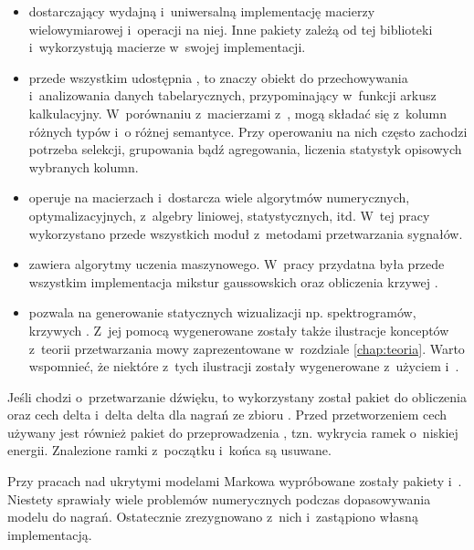 \begin{itemize}
    \item {} dostarczający wydajną i~uniwersalną implementację macierzy wielowymiarowej i~operacji na niej.
        Inne pakiety zależą od tej biblioteki i~wykorzystują macierze w~swojej implementacji.
    \item {} przede wszystkim udostępnia , to znaczy obiekt do przechowywania i~analizowania danych tabelarycznych, przypominający w~funkcji arkusz kalkulacyjny. W~porównaniu z~macierzami z~,  mogą składać się z~kolumn różnych typów i~o różnej semantyce. Przy operowaniu na nich często zachodzi potrzeba selekcji, grupowania bądź agregowania, liczenia statystyk opisowych wybranych kolumn.
    \item {} operuje na macierzach  i~dostarcza wiele algorytmów numerycznych, optymalizacyjnych, z~algebry liniowej, statystycznych, itd. W~tej pracy wykorzystano przede wszystkich moduł z~metodami przetwarzania sygnałów.
    \item {} zawiera algorytmy uczenia maszynowego. W~pracy przydatna była przede wszystkim implementacja mikstur gaussowskich oraz obliczenia krzywej .
    \item {} pozwala na generowanie statycznych wizualizacji np. spektrogramów, krzywych . Z~jej pomocą wygenerowane zostały także ilustracje konceptów z~teorii przetwarzania mowy zaprezentowane w~rozdziale \ref{chap:teoria}. Warto wspomnieć, że niektóre z~tych ilustracji zostały wygenerowane z~użyciem  i~.
\end{itemize}

Jeśli chodzi o~przetwarzanie dźwięku, to wykorzystany został pakiet 
do obliczenia  oraz cech delta i~delta delta dla nagrań ze zbioru .
Przed przetworzeniem cech używany jest również pakiet  do przeprowadzenia
, tzn. wykrycia ramek o~niskiej energii. Znalezione ramki z~początku i~końca są usuwane.

Przy pracach nad ukrytymi modelami Markowa wypróbowane zostały pakiety  i~.
Niestety sprawiały wiele problemów numerycznych podczas dopasowywania modelu do nagrań. Ostatecznie zrezygnowano z~nich
i~zastąpiono własną implementacją.

